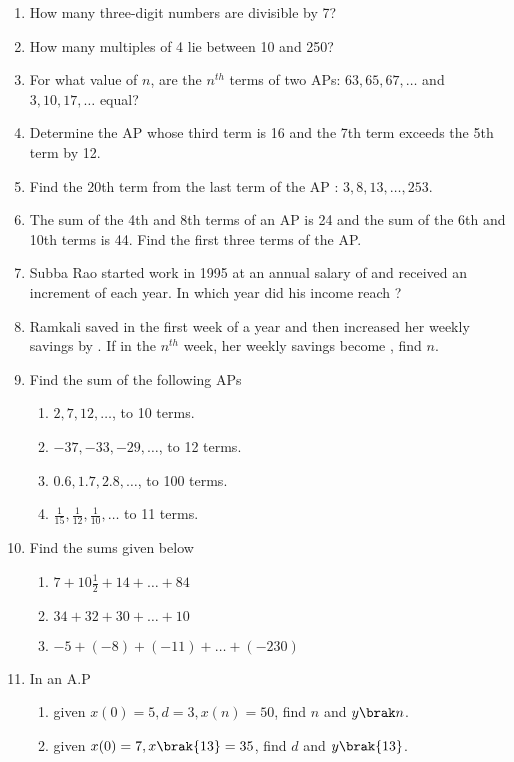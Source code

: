 \begin{enumerate}[label=\thesubsection.\arabic*, ref=\thesubsection.\theenumi]
\item How many three-digit numbers are divisible by 7?
\item How many multiples of 4 lie between 10 and 250?
\item For what value of $n$,  are the $n^{th}$ terms of two APs: $63,  65,  67, \dots $  and $3,  10,  17, \dots $  equal?
\item Determine the AP whose third term is 16 and the 7th term exceeds the 5th term by 12.
\item Find the 20th term from the last term of the AP : $3,  8,  13, \dots  ,  253$.
\item The sum of the 4th and 8th terms of an AP is 24 and the sum of the 6th and 10th terms is 44. Find the first three terms of the AP.
\item Subba Rao started work in 1995 at an annual salary of  and received an increment of  each year. In which year did his income reach ?
\item Ramkali saved  in the first week of a year and then increased her weekly savings by . If in the $n^{th}$ week,  her weekly savings become ,  find $n$.
\item Find the sum of the following APs
	\begin{multicols}{2}
\begin{enumerate}
	\item $2,  7,  12,  \dots $,  to 10 terms.
	\item $-37,  -33,  -29,  \dots $,  to 12 terms.
	\item $ 0.6,  1.7,  2.8,  \dots $,  to 100 terms.
	\item $\frac{1}{15},  \frac{1}{12},  \frac{1}{10}, \dots  $ to 11 terms.
\end{enumerate}
\end{multicols}
\item Find the sums given below 
\begin{enumerate}
\item $7+10\frac{1}{2}+14+\dots +84$
\item $34 + 32 + 30 + \dots + 10$
\item $-5 + (-8) + (-11) + \dots + (-230)$
\end{enumerate}
\item In an A.P
\begin{enumerate}
\item given $x(0) = 5,  d = 3,  x(n) = 50$,  find $n$ and $y\brak n$.
\item given $x(0) = 7,  x\brak{13} = 35$,  find $d$ and $y\brak {13}$.

\end{enumerate}
\end{enumerate}
